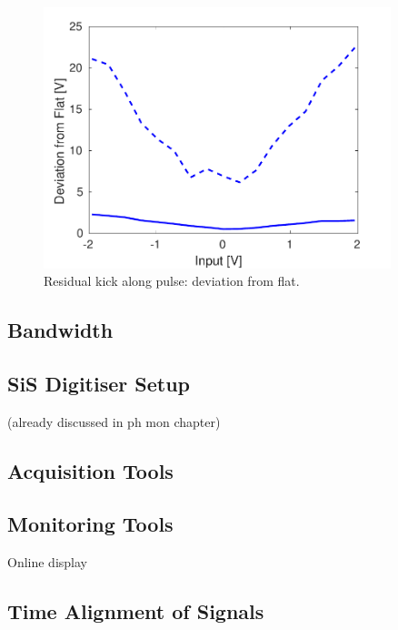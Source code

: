 \begin{figure}
  \centering
  \includegraphics[width=0.9\textwidth]{Figures/commissioning/residualKick_Flatness}
  \caption{Residual kick along pulse: deviation from flat.}
  \label{f:ampClosureFlatness}
\end{figure}

\subsection{Bandwidth}
\label{ss:ampBand}


\subsection{SiS Digitiser Setup}
\label{ss:sisSetup}

(already discussed in ph mon chapter)

\subsection{Acquisition Tools}
\label{ss:acqTools}

\subsection{Monitoring Tools}
\label{ss:monTools}

Online display

\subsection{Time Alignment of Signals}
\label{ss:timeAlignment}

